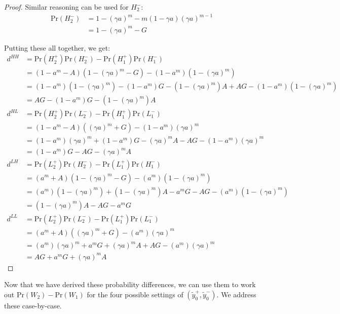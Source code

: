 \begin{proof}
Similar reasoning can be used for $H_2^{-}$:
\begin{align}
\textrm{Pr}(H_2^{-}) &= 1 - (\gamma a)^m - m (1 - \gamma a)(\gamma a)^{m-1}\\
&= 1 - (\gamma a)^m - G
\end{align}

Putting these all together, we get:
\begin{align}
d^{HH} &= \textrm{Pr}(H_2^{+}) \textrm{Pr}(H_2^{-}) - \textrm{Pr}(H_1^{+}) \textrm{Pr}(H_1^{-})\\
&= (1 - a^m - A) (1 - (\gamma a)^m - G) - (1 - a^m) (1 - (\gamma a)^m)\\
&= (1 - a^m) (1 - (\gamma a)^m) - (1 - a^m) G - (1 - (\gamma a)^m) A + AG - (1 - a^m) (1 - (\gamma a)^m)\\
&= AG - (1 - a^m) G - (1 - (\gamma a)^m) A\\
d^{HL} &= \textrm{Pr}(H_2^{+}) \textrm{Pr}(L_2^{-}) - \textrm{Pr}(H_1^{+}) \textrm{Pr}(L_1^{-})\\
&= (1 - a^m - A) ((\gamma a)^m + G) - (1 - a^m) (\gamma a)^m\\
&= (1 - a^m) (\gamma a)^m + (1 - a^m) G - (\gamma a)^m A - AG - (1 - a^m) (\gamma a)^m\\
&= (1 - a^m) G - AG - (\gamma a)^m A\\
d^{LH} &= \textrm{Pr}(L_2^{+}) \textrm{Pr}(H_2^{-}) - \textrm{Pr}(L_1^{+}) \textrm{Pr}(H_1^{-})\\
&= (a^m + A) (1 - (\gamma a)^m - G) - (a^m) (1 - (\gamma a)^m)\\
&= (a^m) (1 - (\gamma a)^m) + (1 - (\gamma a)^m) A - a^m G - AG - (a^m) (1 - (\gamma a)^m)\\
&= (1 - (\gamma a)^m) A - AG - a^m G\\
d^{LL} &= \textrm{Pr}(L_2^{+}) \textrm{Pr}(L_2^{-}) - \textrm{Pr}(L_1^{+}) \textrm{Pr}(L_1^{-})\\
&= (a^m + A) ((\gamma a)^m + G) - (a^m) (\gamma a)^m\\
&= (a^m) (\gamma a)^m + a^m G + (\gamma a)^m A + AG - (a^m) (\gamma a)^m\\
& = AG + a^m G + (\gamma a)^m A
\end{align}
\end{proof}

Now that we have derived these probability differences, we can use them to work out $\textrm{Pr}(W_2) - \textrm{Pr}(W_1)$ for the four possible settings of $(\tilde{y}_0^{+}, \tilde{y}_0^{-})$. We address these case-by-case.

